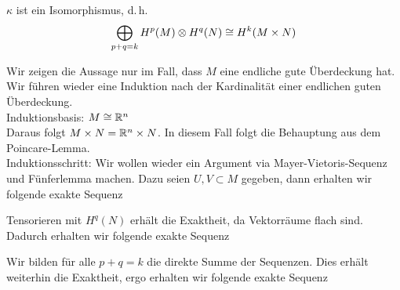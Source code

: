 $\kappa$ ist ein Isomorphismus, d.\,h.
\begin{align*}
\bigoplus_{p+q = k} H^p(M) \otimes H^q(N) \overset{}{\cong} H^{k}(M\times N)
\end{align*}
\begin{Beweis}{}
Wir zeigen die Aussage nur im Fall, dass $M$ eine endliche gute Überdeckung hat.\\
Wir führen wieder eine Induktion nach der Kardinalität einer endlichen guten Überdeckung.\\
Induktionsbasis: $M \overset{}{\cong} \mathbb{R}^n$\\
Daraus folgt $M\times N = \mathbb{R}^n \times N$. In diesem Fall folgt die Behauptung aus dem Poincare-Lemma.\\
Induktionsschritt: Wir wollen wieder ein Argument via Mayer-Vietoris-Sequenz und Fünferlemma machen. Dazu seien $U,V\subset M$ gegeben, dann erhalten wir folgende exakte Sequenz
\begin{center}
\end{center}
Tensorieren mit $H^q(N)$ erhält die Exaktheit, da Vektorräume flach sind. Dadurch erhalten wir folgende exakte Sequenz
\begin{scriptsize}
	\begin{center}
\end{center}
\end{scriptsize}
Wir bilden für alle $p+q = k$ die direkte Summe der Sequenzen. Dies erhält weiterhin die Exaktheit, ergo erhalten wir folgende exakte Sequenz
\begin{tiny}	
\begin{center}

\end{center}
\end{tiny}
\end{Beweis}
